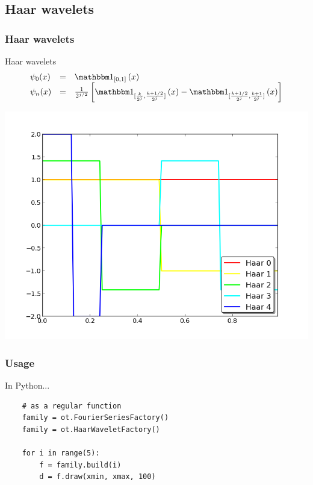 \documentclass{beamer}
\begin{document}
\subsection[Haar wavelets]{Haar wavelets}
\begin{frame}
  \frametitle{Haar wavelets}

  \begin{block}{Haar wavelets}
    $$
    \begin{array}{lcl}
      \psi_0(x) & = & \fcar{[0, 1]}{x} \\
      \psi_n(x) & = & \frac{1}{2^{j/2}}\left[\fcar{[\frac{k}{2^j},\frac{k+1/2}{2^j}]}{x}-\fcar{[\frac{k+1/2}{2^j},\frac{k+1}{2^j}]}{x}\right]
    \end{array}
    $$
  \end{block}
  \includegraphics[scale=0.3]{figures/haar.png}
\end{frame}

\begin{frame}[containsverbatim]
  \frametitle{Usage}
  \begin{block}{In Python...}
    \begin{lstlisting}
    # as a regular function
    family = ot.FourierSeriesFactory()
    family = ot.HaarWaveletFactory()

    for i in range(5):
        f = family.build(i)
        d = f.draw(xmin, xmax, 100)
    \end{lstlisting}
  \end{block}
\end{frame}
\end{document}
